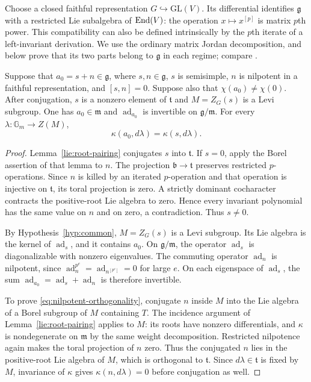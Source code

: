Choose a closed faithful representation $G\hookrightarrow\mathrm{GL}(V)$.
Its differential identifies $\mathfrak g$ with a restricted Lie
subalgebra of $\operatorname{End}(V)$: the operation $x\mapsto x^{[p]}$ is matrix
$p$th power.  This compatibility can also be defined intrinsically
by the $p$th iterate of a left-invariant derivation.  We use the
ordinary matrix Jordan decomposition, and below prove that its two
parts belong to $\mathfrak g$ in each regime; compare
\cite[\S4.4, Theorem~4.4.20]{Springer}.

\begin{lemma}\label{lie:constant-parts}
Suppose that $a_0=s+n\in\mathfrak g$, where $s,n\in\mathfrak g$,
$s$ is semisimple, $n$ is nilpotent in a faithful representation,
and $[s,n]=0$.  Suppose also that $\chi(a_0)\ne\chi(0)$.
After conjugation, $s$ is a nonzero element of $\mathfrak t$ and
$M=Z_G(s)$ is a Levi subgroup.  One has $a_0\in\mathfrak m$ and
$\operatorname{ad}_{a_0}$ is invertible on $\mathfrak g/\mathfrak m$.
For every $\lambda:\mathbb G_m\to Z(M)$,
\begin{equation}\label{eq:nilpotent-orthogonality}
 \kappa(a_0,d\lambda)=\kappa(s,d\lambda).
\end{equation}
\end{lemma}

\begin{proof}
Lemma~\ref{lie:root-pairing} conjugates $s$ into $\mathfrak t$.
If $s=0$, apply the Borel assertion of that lemma to $n$.
The projection $\mathfrak b\to\mathfrak t$ preserves restricted
$p$-operations.  Since $n$ is killed by an iterated $p$-operation
and that operation is injective on $\mathfrak t$, its toral
projection is zero.  A strictly dominant cocharacter contracts the
positive-root Lie algebra to zero.  Hence every invariant polynomial
has the same value on $n$ and on zero, a contradiction.  Thus $s\ne0$.

By Hypothesis~\ref{hyp:common}, $M=Z_G(s)$ is a Levi subgroup.
Its Lie algebra is the kernel of $\operatorname{ad}_s$, and it contains $a_0$.
On $\mathfrak g/\mathfrak m$, the operator $\operatorname{ad}_s$ is diagonalizable
with nonzero eigenvalues.  The commuting operator $\operatorname{ad}_n$ is
nilpotent, since
$\operatorname{ad}_n^{p^e}=\operatorname{ad}_{n^{[p^e]}}=0$ for large $e$.
On each eigenspace of $\operatorname{ad}_s$, the sum
$\operatorname{ad}_{a_0}=\operatorname{ad}_s+\operatorname{ad}_n$ is therefore invertible.

To prove \eqref{eq:nilpotent-orthogonality}, conjugate $n$ inside $M$
into the Lie algebra of a Borel subgroup of $M$ containing $T$.
The incidence argument of Lemma~\ref{lie:root-pairing} applies to
$M$: its roots have nonzero differentials, and $\kappa$ is
nondegenerate on $\mathfrak m$ by the same weight decomposition.
Restricted nilpotence again makes the toral projection of $n$ zero.
Thus the conjugated $n$ lies in the positive-root Lie algebra of $M$,
which is orthogonal to $\mathfrak t$.  Since $d\lambda\in\mathfrak t$
is fixed by $M$, invariance of $\kappa$ gives
$\kappa(n,d\lambda)=0$ before conjugation as well.
\end{proof}

